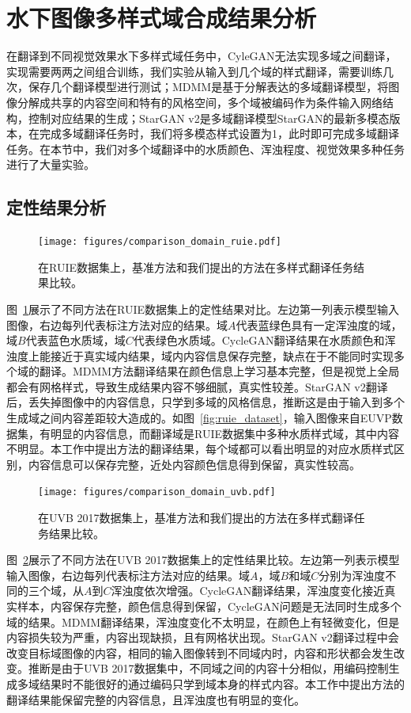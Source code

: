 \section{水下图像多样式域合成结果分析}
在翻译到不同视觉效果水下多样式域任务中，CyleGAN无法实现多域之间翻译，实现需要两两之间组合训练，我们实验从输入到几个域的样式翻译，需要训练几次，保存几个翻译模型进行测试；MDMM是基于分解表达的多域翻译模型，将图像分解成共享的内容空间和特有的风格空间，多个域被编码作为条件输入网络结构，控制对应结果的生成；StarGAN v2是多域翻译模型StarGAN的最新多模态版本，在完成多域翻译任务时，我们将多模态样式设置为1，此时即可完成多域翻译任务。在本节中，我们对多个域翻译中的水质颜色、浑浊程度、视觉效果多种任务进行了大量实验。

\subsection{定性结果分析}
\begin{figure}
    \centering
  \texttt{[image: figures/comparison\_domain\_ruie.pdf]}
  \caption{在RUIE数据集上，基准方法和我们提出的方法在多样式翻译任务结果比较。}
  \label{fig:comparison_domain_ruie}
\end{figure}

图~\ref{fig:comparison_domain_ruie}展示了不同方法在RUIE数据集上的定性结果对比。左边第一列表示模型输入图像，右边每列代表标注方法对应的结果。域$A$代表蓝绿色具有一定浑浊度的域，域$B$代表蓝色水质域，域$C$代表绿色水质域。CycleGAN翻译结果在水质颜色和浑浊度上能接近于真实域内结果，域内内容信息保存完整，缺点在于不能同时实现多个域的翻译。MDMM方法翻译结果在颜色信息上学习基本完整，但是视觉上全局都会有网格样式，导致生成结果内容不够细腻，真实性较差。StarGAN v2翻译后，丢失掉图像中的内容信息，只学到多域的风格信息，推断这是由于输入到多个生成域之间内容差距较大造成的。如图~\ref{fig:ruie_dataset}，输入图像来自EUVP数据集，有明显的内容信息，而翻译域是RUIE数据集中多种水质样式域，其中内容不明显。本工作中提出方法的翻译结果，每个域都可以看出明显的对应水质样式区别，内容信息可以保存完整，近处内容颜色信息得到保留，真实性较高。

\begin{figure}
    \centering
  \texttt{[image: figures/comparison\_domain\_uvb.pdf]}
  \caption{在UVB 2017数据集上，基准方法和我们提出的方法在多样式翻译任务结果比较。}
  \label{fig:comparison_domain_uvb}
\end{figure}

图~\ref{fig:comparison_domain_uvb}展示了不同方法在UVB 2017数据集上的定性结果比较。左边第一列表示模型输入图像，右边每列代表标注方法对应的结果。域$A$，域$B$和域$C$分别为浑浊度不同的三个域，从$A$到$C$浑浊度依次增强。CycleGAN翻译结果，浑浊度变化接近真实样本，内容保存完整，颜色信息得到保留，CycleGAN问题是无法同时生成多个域的结果。MDMM翻译结果，浑浊度变化不太明显，在颜色上有轻微变化，但是内容损失较为严重，内容出现缺损，且有网格状出现。StarGAN v2翻译过程中会改变目标域图像的内容，相同的输入图像转到不同域内时，内容和形状都会发生改变。推断是由于UVB 2017数据集中，不同域之间的内容十分相似，用编码控制生成多域结果时不能很好的通过编码只学到域本身的样式内容。本工作中提出方法的翻译结果能保留完整的内容信息，且浑浊度也有明显的变化。

